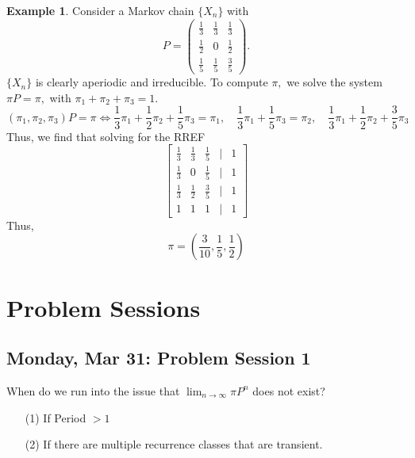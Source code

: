 \documentclass[10pt, oneside]{article}
\theoremstyle{definition}
\newtheorem{exmp}{Example}[section]
\begin{document}
\begin{exmp}
    Consider a Markov chain $\{X_n\}$ with 
    \[P = \begin{pmatrix}
        \frac{1}{3} & \frac{1}{3} & \frac{1}{3}\\
        \frac{1}{2} & 0 & \frac{1}{2}\\
        \frac{1}{5} & \frac{1}{5} & \frac{3}{5}
    \end{pmatrix}.\] $\{X_n\}$ is clearly aperiodic and irreducible. To compute $\pi,$ we solve the system $\pi P  = \pi,$ with $\pi_1 + \pi_2  + \pi_3 = 1.$ 
    \[(\pi_1 , \pi_2 ,\pi_3) P  = \pi \iff \frac{1}{3}\pi_1 + \frac{1}{2}\pi_2 + \frac{1}{5}\pi_3 = \pi_1,\quad  \frac{1}{3}\pi_1 + \frac{1}{5}\pi_3  = \pi_2, \quad  \frac{1}{3}\pi_1 + \frac{1}{2}\pi_2 + \frac{3}{5}\pi_3\]
    Thus, we find that solving for the RREF
    \[\begin{bmatrix}
        \frac{1}{3} & \frac{1}{3} & \frac{1}{5} & | & 1\\
        \frac{1}{3} & 0 & \frac{1}{5}& | & 1\\
        \frac{1}{3} & \frac{1}{2} & \frac{3}{5}& | & 1\\
        1 & 1 & 1 & | & 1
    \end{bmatrix}\]
    Thus, 
    \[\pi = (\frac{3}{10}, \frac{1}{5}, \frac{1}{2})\]
\end{exmp}



\newpage
\section{Problem Sessions}
\subsection{Monday, Mar 31: Problem Session 1}
When do we run into the issue that $\lim_{n\to \infty}\pi P^n$ does not exist? 
\begin{enumerate}
    \item[(1)] If Period $> 1$
    \item[(2)] If there are multiple recurrence classes that are transient.
\end{enumerate}
\end{document}
